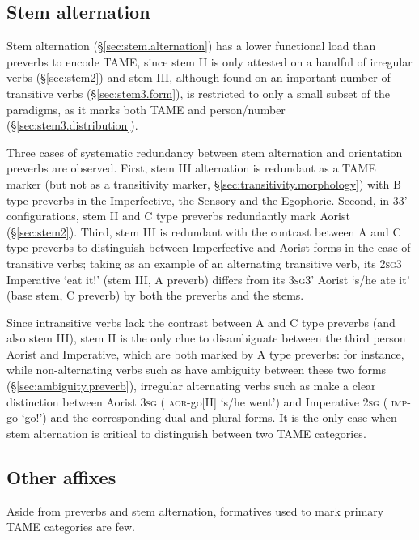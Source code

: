 \subsection{Stem alternation} \label{sec:stem.TAME}
Stem alternation (§\ref{sec:stem.alternation}) has a lower functional load than preverbs to encode TAME, since stem II is only attested on a handful of irregular verbs (§\ref{sec:stem2}) and stem III, although found on an important number of transitive verbs (§\ref{sec:stem3.form}), is restricted to only a small subset of the paradigms, as it marks both TAME and person/number (§\ref{sec:stem3.distribution}).

Three cases of systematic redundancy between stem alternation and orientation preverbs are observed. First, stem III alternation is redundant as a TAME marker (but not as a transitivity marker, §\ref{sec:transitivity.morphology}) with B type preverbs in the Imperfective, the Sensory and the Egophoric. Second, in 3\fl{}3' configurations, stem II and C type preverbs redundantly mark Aorist (§\ref{sec:stem2}). Third, stem III is redundant with the contrast between A and C type preverbs to distinguish between Imperfective and Aorist forms in the case of transitive verbs; taking  as an example of an alternating transitive verb, its \textsc{2sg}\fl{}3 Imperative  `eat it!' (stem III, A preverb) differs from its \textsc{3sg}\fl{}3' Aorist  `s/he ate it' (base stem, C preverb) by both the preverbs and the stems.

Since intransitive verbs lack the contrast between A and C type preverbs (and also stem III), stem II is  the only clue to disambiguate between the third person Aorist and Imperative, which are both marked by A type preverbs: for instance, while non-alternating verbs such as  have ambiguity between these two forms (§\ref{sec:ambiguity.preverb}), irregular alternating verbs such as  make a clear distinction between Aorist \textsc{3sg} ( \textsc{aor}-go[II] `s/he went') and Imperative \textsc{2sg} ( \textsc{imp}-go `go!') and the corresponding dual and plural forms. It is the only case when stem alternation is critical to distinguish between two TAME categories.


\subsection{Other affixes} \label{sec:other.TAME}
Aside from preverbs and stem alternation, formatives used to mark primary TAME categories are few. 

